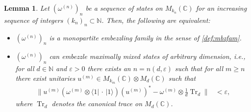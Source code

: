 \documentclass[a4paper, 10pt, onecolumn, accepted=2025-07-22]{quantumarticle}
\newtheorem{lemma}[theorem]{Lemma}
\theoremstyle{definition}
\newcommand{\ket}[1]{|#1\rangle}
\newcommand{\bra}[1]{\langle#1|}
\newcommand{\norm}[1]{\lVert #1\rVert}
\newcommand{\ox}{\otimes}
\newcommand{\eps}{\varepsilon}
\newcommand{\up}[1]{^{(#1)}}
\DeclareMathOperator{\tr}{Tr}
\def\CC{{\mathbb C}}
\def\NN{{\mathbb N}}
\newcommand*{\1}{\text{\usefont{U}{bbold}{m}{n}1}}
\newcommand{\placeholder}[0]{{\,\cdot\,}}
\begin{document}
\begin{lemma}
\label{lem:mbz_traces}
Let $(\omega\up{n})_{n}$ be a sequence of states on $M_{k_n}(\CC)$ for an increasing sequence of integers $(k_{n})_{n}\subset \NN$. Then, the following are equivalent:
\begin{itemize}
    \item[(1)] $(\omega\up{n})_{n}$ is a monopartite embezzling family in the sense of \cref{def:mbzfam}.
    \item[(2)] $(\omega\up{n})_{n}$ can embezzle maximally mixed states of arbitrary dimension, i.e., for all $d\in\NN$ and $\eps>0$ there exists an $n=n(d,\eps)$ such that for all $m\geq n$ there exist unitaries $u\up{m}\in M_{k_m}(\CC)\ox M_d(\CC)$ such that
    \begin{align}
    \label{eq:mbz_traces}
    \norm{u\up{m}(\omega\up{m}\ox\bra1\placeholder\ket1)(u\up{m})^{*}-\omega\up{m}\ox\tfrac{1}{d}\tr_{d}} & < \eps,
    \end{align}
    where $\tr_{d}$ denotes the canonical trace on $M_{d}(\CC)$.
\end{itemize}
\end{lemma}
\end{document}
